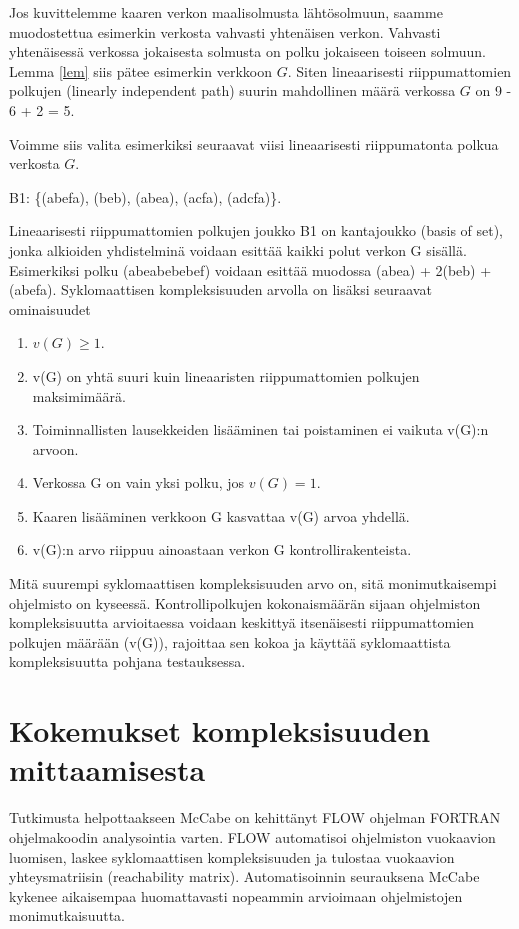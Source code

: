 \documentclass[finnish]{tktltiki2}
\theoremstyle{definition}
\theoremstyle{remark}
\begin{document}
Jos kuvittelemme kaaren verkon maalisolmusta lähtösolmuun, saamme muodostettua esimerkin verkosta vahvasti yhtenäisen verkon. Vahvasti yhtenäisessä verkossa jokaisesta solmusta on polku jokaiseen toiseen solmuun. Lemma \eqref{lem} siis pätee esimerkin verkkoon $G$. Siten lineaarisesti riippumattomien polkujen (linearly independent path) suurin mahdollinen määrä verkossa $G$ on 9 - 6 + 2 = 5.

Voimme siis valita esimerkiksi seuraavat viisi lineaarisesti riippumatonta polkua verkosta $G$.

\centerline{B1: \{(abefa), (beb), (abea), (acfa), (adcfa)\}.}

Lineaarisesti riippumattomien polkujen joukko B1 on kantajoukko (basis of set), jonka alkioiden yhdistelminä voidaan esittää kaikki polut verkon G sisällä. Esimerkiksi polku (abeabebebef) voidaan esittää muodossa (abea) + 2(beb) + (abefa).
\newpage
Syklomaattisen kompleksisuuden arvolla on lisäksi seuraavat ominaisuudet
\begin{enumerate}
  \item $ v(G) \geq 1. $
  \item v(G) on yhtä suuri kuin lineaaristen riippumattomien polkujen maksimimäärä.
  \item Toiminnallisten lausekkeiden lisääminen tai poistaminen ei vaikuta v(G):n arvoon.
  \item Verkossa G on vain yksi polku, jos $v(G) = 1$.
  \item Kaaren lisääminen verkkoon G kasvattaa v(G) arvoa yhdellä.
  \item v(G):n arvo riippuu ainoastaan verkon G kontrollirakenteista.
\end{enumerate}

Mitä suurempi syklomaattisen kompleksisuuden arvo on, sitä monimutkaisempi ohjelmisto on kyseessä. Kontrollipolkujen kokonaismäärän sijaan ohjelmiston kompleksisuutta arvioitaessa voidaan keskittyä itsenäisesti riippumattomien polkujen määrään (v(G)), rajoittaa sen kokoa ja käyttää syklomaattista kompleksisuutta pohjana testauksessa.

\section{Kokemukset kompleksisuuden mittaamisesta}

Tutkimusta helpottaakseen McCabe on kehittänyt FLOW ohjelman FORTRAN ohjelmakoodin analysointia varten. FLOW automatisoi ohjelmiston vuokaavion luomisen, laskee syklomaattisen kompleksisuuden ja tulostaa vuokaavion yhteysmatriisin (reachability matrix). Automatisoinnin seurauksena McCabe kykenee aikaisempaa huomattavasti nopeammin arvioimaan ohjelmistojen monimutkaisuutta.
\end{document}
